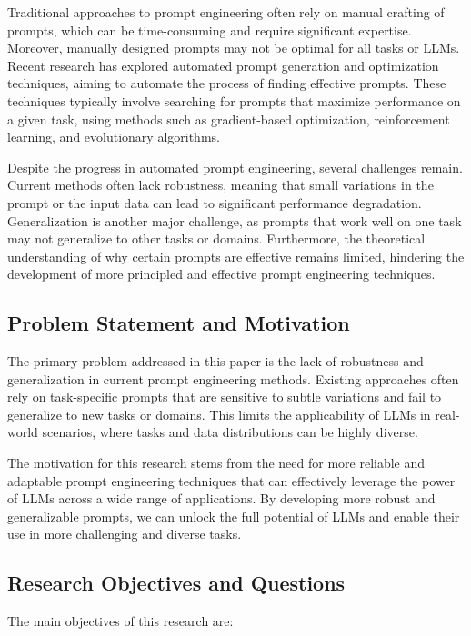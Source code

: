 \documentclass{article}
\begin{document}
Traditional approaches to prompt engineering often rely on manual crafting of prompts, which can be time-consuming and require significant expertise. Moreover, manually designed prompts may not be optimal for all tasks or LLMs. Recent research has explored automated prompt generation and optimization techniques, aiming to automate the process of finding effective prompts. These techniques typically involve searching for prompts that maximize performance on a given task, using methods such as gradient-based optimization, reinforcement learning, and evolutionary algorithms.

Despite the progress in automated prompt engineering, several challenges remain. Current methods often lack robustness, meaning that small variations in the prompt or the input data can lead to significant performance degradation. Generalization is another major challenge, as prompts that work well on one task may not generalize to other tasks or domains. Furthermore, the theoretical understanding of why certain prompts are effective remains limited, hindering the development of more principled and effective prompt engineering techniques.

\subsection{Problem Statement and Motivation}

The primary problem addressed in this paper is the lack of robustness and generalization in current prompt engineering methods. Existing approaches often rely on task-specific prompts that are sensitive to subtle variations and fail to generalize to new tasks or domains. This limits the applicability of LLMs in real-world scenarios, where tasks and data distributions can be highly diverse.

The motivation for this research stems from the need for more reliable and adaptable prompt engineering techniques that can effectively leverage the power of LLMs across a wide range of applications. By developing more robust and generalizable prompts, we can unlock the full potential of LLMs and enable their use in more challenging and diverse tasks.

\subsection{Research Objectives and Questions}

The main objectives of this research are:
\end{document}

